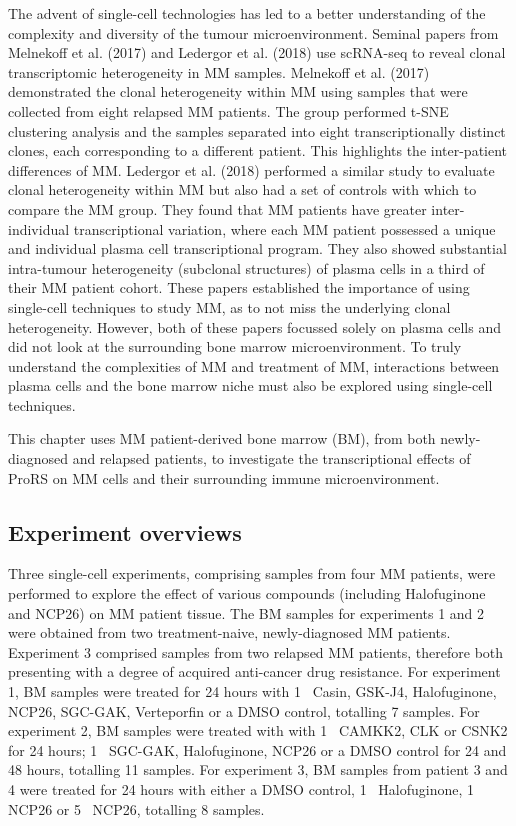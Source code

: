 The advent of single-cell technologies has led to a better understanding of the complexity and diversity of the tumour microenvironment.
Seminal papers from Melnekoff et al. (2017)\cite{melnekoff2017single} and Ledergor et al. (2018)\cite{ledergor2018single} use scRNA-seq to reveal clonal transcriptomic heterogeneity in MM samples.
Melnekoff et al. (2017) demonstrated the clonal heterogeneity within MM using samples that were collected from eight relapsed MM patients.
The group performed t-SNE clustering analysis and the samples separated into eight transcriptionally distinct clones, each corresponding to a different patient.
This highlights the inter-patient differences of MM\@.
Ledergor et al. (2018) performed a similar study to evaluate clonal heterogeneity within MM but also had a set of controls with which to compare the MM group.
They found that MM patients have greater inter-individual transcriptional variation, where each MM patient possessed a unique and individual plasma cell transcriptional program.
They also showed substantial intra-tumour heterogeneity (subclonal structures) of plasma cells in a third of their MM patient cohort.
These papers established the importance of using single-cell techniques to study MM, as to not miss the underlying clonal heterogeneity.
However, both of these papers focussed solely on plasma cells and did not look at the surrounding bone marrow microenvironment.
To truly understand the complexities of MM and treatment of MM, interactions between plasma cells and the bone marrow niche must also be explored using single-cell techniques.

This chapter uses MM patient-derived bone marrow (BM), from both newly-diagnosed and relapsed patients, to investigate the transcriptional effects of ProRS on MM cells and their surrounding immune microenvironment.

\subsection{Experiment overviews}\label{subsec:scrna_experiment}
Three single-cell experiments, comprising samples from four MM patients, were performed to explore the effect of various compounds (including Halofuginone and NCP26) on MM patient tissue.
The BM samples for experiments 1 and 2 were obtained from two treatment-naive, newly-diagnosed MM patients.
Experiment 3 comprised samples from two relapsed MM patients, therefore both presenting with a degree of acquired anti-cancer drug resistance.
For experiment 1, BM samples were treated for 24 hours with 1\si{\micro\Molar} Casin, GSK-J4, Halofuginone, NCP26, SGC-GAK, Verteporfin or a DMSO control, totalling 7 samples.
For experiment 2, BM samples were treated with with 1\si{\micro\Molar} CAMKK2, CLK or CSNK2 for 24 hours; 1\si{\micro\Molar} SGC-GAK, Halofuginone, NCP26 or a DMSO control for 24 and 48 hours, totalling 11 samples.
For experiment 3, BM samples from patient 3 and 4 were treated for 24 hours with either a DMSO control, 1\si{\micro\Molar} Halofuginone, 1\si{\micro\Molar} NCP26 or 5\si{\micro\Molar} NCP26, totalling 8 samples.

